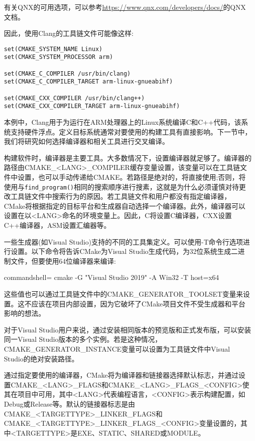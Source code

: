 有关QNX的可用选项，可以参考\url{https://www.qnx.com/developers/docs/}的QNX文档。

因此，使用Clang的工具链文件可能像这样:

\begin{lstlisting}[style=styleCMake]
set(CMAKE_SYSTEM_NAME Linux)
set(CMAKE_SYSTEM_PROCESSOR arm)

set(CMAKE_C_COMPILER /usr/bin/clang)
set(CMAKE_C_COMPILER_TARGET arm-linux-gnueabihf)

set(CMAKE_CXX_COMPILER /usr/bin/clang++)
set(CMAKE_CXX_COMPILER_TARGET arm-linux-gnueabihf)
\end{lstlisting}

本例中，Clang用于为运行在ARM处理器上的Linux系统编译C和C++代码，该系统支持硬件浮点。定义目标系统通常对要使用的构建工具有直接影响。下一节中，我们将研究如何选择编译器和相关工具进行交叉编译。


构建软件时，编译器是主要工具。大多数情况下，设置编译器就足够了。编译器的路径由CMAKE\_<LANG>\_COMPILER缓存变量设置，该变量可以在工具链文件中设置，也可以手动传递给CMAKE。若路径是绝对的，将直接使用;否则，将使用与\texttt{find\_program()}相同的搜索顺序进行搜素，这就是为什么必须谨慎对待更改工具链文件中搜索行为的原因。若工具链文件和用户都没有指定编译器，CMake将根据指定的目标平台和生成器自动选择一个编译器。此外，编译器可以设置在以<LANG>命名的环境变量上。因此，C将设置C编译器，CXX设置C++编译器，ASM设置汇编器等。

一些生成器(如Visual Studio)支持的不同的工具集定义。可以使用-T命令行选项进行设置。以下命令将告诉CMake为Visual Studio生成代码，为32位系统生成二进制文件，但要使用64位编译器来编译:

\begin{tcblisting}{commandshell={}}
cmake -G "Visual Studio 2019" -A Win32 -T host=x64
\end{tcblisting}

这些值也可以通过工具链文件中的CMAKE\_GENERATOR\_TOOLSET变量来设置。这不应该在项目内部设置，因为它破坏了CMake项目文件不受生成器和平台影响的想法。

对于Visual Studio用户来说，通过安装相同版本的预览版和正式发布版，可以安装同一Visual Studio版本的多个实例。若是这种情况，CMAKE\_GENERATOR\_INSTANCE变量可以设置为工具链文件中Visual Studio的绝对安装路径。

通过指定要使用的编译器，CMake将为编译器和链接器选择默认标志，并通过设置CMAKE\_<LANG>\_FLAGS和CMAKE\_<LANG>\_FLAGS\_<CONFIG>使其在项目中可用，其中<LANG>代表编程语言，<CONFIG>表示构建配置，如Debug或Release等。默认的链接器标志是由CMAKE\_<TARGETTYPE>\_LINKER\_FLAGS和CMAKE\_<TARGETTYPE>\_LINKER\_FLAGS\_<CONFIG>变量设置的，其中<TARGETTYPE>是EXE、STATIC、SHARED或MODULE。

